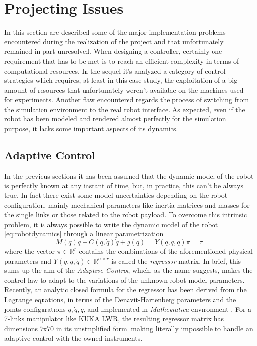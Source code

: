 \section{Projecting Issues}
In this section are described some of the major implementation problems encountered during the realization of the project and that unfortunately remained in part unresolved. When designing a controller, certainly one requirement that has to be met is to reach an efficient complexity in terms of computational resources. In the sequel it's analyzed a category of control strategies which requires, at least in this case study, the exploitation of a big amount of resources that unfortunately weren't available on the machines used for experiments. Another flaw encountered regards the process of switching from the simulation environment to the real robot interface. As expected, even if the robot has been modeled and rendered almost perfectly for the simulation purpose, it lacks some important aspects of its dynamics.
\subsection{Adaptive Control}
In the previous sections it has been assumed that the dynamic model of the robot is perfectly known at any instant of time, but, in practice, this can't be always true. In fact there exist some model uncertainties depending on the robot configuration, mainly mechanical parameters like inertia matrices and masses for the single links or those related to the robot payload. To overcome this intrinsic problem, it is always possible to write the dynamic model of the robot \eqref{eq:robotdynamics} through a linear parametrization
\begin{equation}
M(q)\ddot{q} + C(q,\dot{q})\dot{q} + g(q) = Y(q,\dot{q},\ddot{q})\pi = \tau
\end{equation}
where the vector $\pi\in\mathbb{R}^r$ contains the combinations of the aforementioned physical parameters and $Y(q,\dot{q},\ddot{q})\in\mathbb{R}^{n\times r}$ is called the \textit{regressor} matrix. In brief, this sums up the aim of the \textit{Adaptive Control}, which, as the name suggests, makes the control law to adapt to the variations of the unknown robot model parameters. Recently, an analytic closed formula for the regressor has been derived from the Lagrange equations, in terms of the Denavit-Hartenberg parameters and the joints configurations  $q,\dot{q},\ddot{q}$, and implemented in \textit{Mathematica} environment \cite{gabiccini09}. For a 7-links manipulator like KUKA LWR, the resulting regressor matrix has dimensions $7$x$70$ in its unsimplified form, making literally impossible to handle an adaptive control with the owned instruments.
